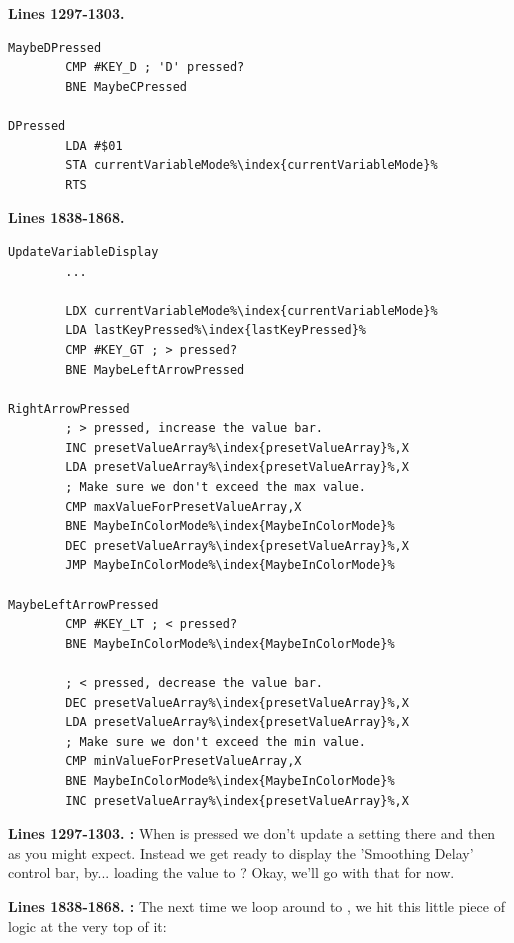 \textbf{Lines 1297-1303. }
\begin{lstlisting}[caption=From \icode{CheckKeyboardInput\index{CheckKeyboardInput}}.,escapechar=\%]
MaybeDPressed   
        CMP #KEY_D ; 'D' pressed?
        BNE MaybeCPressed

DPressed
        LDA #$01
        STA currentVariableMode%\index{currentVariableMode}%
        RTS 
\end{lstlisting}
\textbf{Lines 1838-1868. }
\begin{lstlisting}[caption=From \icode{CheckKeyboardInputForActiveVariable}.,escapechar=\%]
UpdateVariableDisplay   
        ...

        LDX currentVariableMode%\index{currentVariableMode}%
        LDA lastKeyPressed%\index{lastKeyPressed}%
        CMP #KEY_GT ; > pressed?
        BNE MaybeLeftArrowPressed

RightArrowPressed
        ; > pressed, increase the value bar.
        INC presetValueArray%\index{presetValueArray}%,X
        LDA presetValueArray%\index{presetValueArray}%,X
        ; Make sure we don't exceed the max value.
        CMP maxValueForPresetValueArray,X
        BNE MaybeInColorMode%\index{MaybeInColorMode}%
        DEC presetValueArray%\index{presetValueArray}%,X
        JMP MaybeInColorMode%\index{MaybeInColorMode}%

MaybeLeftArrowPressed   
        CMP #KEY_LT ; < pressed?
        BNE MaybeInColorMode%\index{MaybeInColorMode}%

        ; < pressed, decrease the value bar.
        DEC presetValueArray%\index{presetValueArray}%,X
        LDA presetValueArray%\index{presetValueArray}%,X
        ; Make sure we don't exceed the min value.
        CMP minValueForPresetValueArray,X
        BNE MaybeInColorMode%\index{MaybeInColorMode}%
        INC presetValueArray%\index{presetValueArray}%,X

\end{lstlisting}
\clearpage
{}
\textbf{Lines 1297-1303. :} When  is pressed we don't
update a setting there and then as you might expect. Instead we get ready to display the 'Smoothing
Delay' control bar, by... loading the value  to ? Okay, we'll
go with that for now.

\textbf{Lines 1838-1868. :}  The next time we loop around
to , we hit this little piece of logic at the very top of it:

